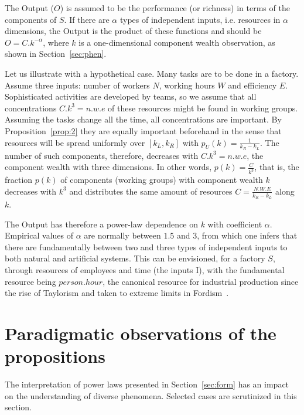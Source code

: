 \documentclass[10pt,letterpaper]{article}
\begin{document}
The Output ($O$)
is assumed to be the performance (or richness) in terms of the components of $S$.
If there are $\alpha$ types of independent inputs, i.e. resources in $\alpha$ dimensions,
the Output is the product of these functions and should be
$O =C.k^{-\alpha}$, where $k$ is a one-dimensional component wealth observation,
as shown in Section~\ref{sec:phen}. 

Let us illustrate with a hypothetical case.
Many tasks are to be done in a factory.
Assume three inputs:
number of workers $N$, working hours $W$
and efficiency $E$.
Sophisticated activities are developed by teams,
so we assume that all concentrations $C.k^3=n.w.e$
of these resources might be found in working groups.
Assuming the tasks change all the time,
all concentrations are important.
By Proposition~\ref{prop:2} they are equally important beforehand
in the sense that 
resources will be spread uniformly over $[k_L,k_R]$
with $p_U(k)=\frac{1}{k_R-k_L}$.
The number of such components, therefore,
decreases with $C.k^3=n.w.e$, the component wealth with three dimensions.
In other words,
$p(k)=\frac{C}{k^3}$, that is,
the fraction $p(k)$ of components (working groups) with component wealth $k$
decreases with $k^3$ and distributes the same
amount of resources $C=\frac{N.W.E}{k_R-k_L}$ along $k$.

The Output has therefore a power-law dependence on $k$ with coefficient $\alpha$. Empirical values of $\alpha$
are normally between $1.5$ and $3$, from which one infers that there are fundamentally between two and three types of independent inputs to both natural and artificial systems. This can be envisioned, for a factory $S$, through resources of employees and time (the inputs I), with the fundamental resource being $person . hour$, the canonical resource for industrial production since the rise of Taylorism and taken to extreme limits in Fordism~\cite{fordism}.

\section{Paradigmatic observations of the propositions}\label{sec:par}
The interpretation of power laws presented in Section~\ref{sec:form} has an impact on the
understanding of
diverse phenomena. Selected cases are scrutinized in this section.
 
\end{document}
